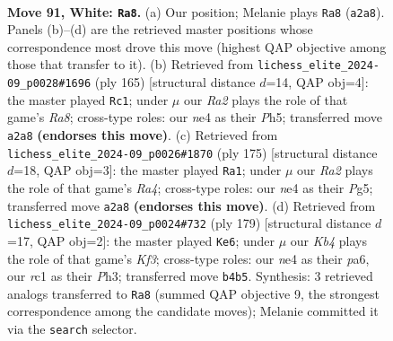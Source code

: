 \documentclass[11pt]{article}
\begin{document}
\clearpage

\begin{figure}[p]\centering
\begin{subfigure}{0.46\textwidth}\centering
\resizebox{\linewidth}{!}{%
\newchessgame
\chessboard[
  setfen={8/8/4k2p/4p3/1K1pn2b/8/R7/2r5 w - - 0 91},
  showmover=false,
  pgfstyle=straightmove, color=movearrow, markmove={a2-a8}
]}
\caption{}
\end{subfigure}\hfill
\begin{subfigure}{0.46\textwidth}\centering
\resizebox{\linewidth}{!}{%
\newchessgame
\chessboard[
  setfen={1R6/5k2/8/7p/7P/6P1/7K/r7 b - - 43 83},
  showmover=false,
  pgfstyle=straightmove, color=movearrow, markmove={a1-c1}
]}
\caption{}
\end{subfigure}
\\[4pt]
\begin{subfigure}{0.46\textwidth}\centering
\resizebox{\linewidth}{!}{%
\newchessgame
\chessboard[
  setfen={8/1R6/4k3/r5p1/6P1/5P2/6K1/8 b - - 83 88},
  showmover=false,
  pgfstyle=straightmove, color=movearrow, markmove={a5-a1}
]}
\caption{}
\end{subfigure}\hfill
\begin{subfigure}{0.46\textwidth}\centering
\resizebox{\linewidth}{!}{%
\newchessgame
\chessboard[
  setfen={8/7r/P4k2/8/2P5/1PK4p/8/3R4 b - - 0 90},
  showmover=false,
  pgfstyle=straightmove, color=movearrow, markmove={f6-e6}
]}
\caption{}
\end{subfigure}
\caption{\textbf{Move 91, White: \texttt{Ra8}.} (a) Our position; Melanie plays \texttt{Ra8} (\texttt{a2a8}). Panels (b)--(d) are the retrieved master positions whose correspondence most drove this move (highest QAP objective among those that transfer to it). (b) Retrieved from \texttt{lichess\_elite\_2024-09\_p0028\#1696} (ply 165) [structural distance $d$=14, QAP obj=4]: the master played \texttt{Rc1}; under $\mu$ our \emph{Ra2} plays the role of that game's \emph{Ra8}; cross-type roles: our \emph{n}e4 as their \emph{P}h5; transferred move \texttt{a2a8} \textbf{(endorses this move)}. (c) Retrieved from \texttt{lichess\_elite\_2024-09\_p0026\#1870} (ply 175) [structural distance $d$=18, QAP obj=3]: the master played \texttt{Ra1}; under $\mu$ our \emph{Ra2} plays the role of that game's \emph{Ra4}; cross-type roles: our \emph{n}e4 as their \emph{P}g5; transferred move \texttt{a2a8} \textbf{(endorses this move)}. (d) Retrieved from \texttt{lichess\_elite\_2024-09\_p0024\#732} (ply 179) [structural distance $d$=17, QAP obj=2]: the master played \texttt{Ke6}; under $\mu$ our \emph{Kb4} plays the role of that game's \emph{Kf3}; cross-type roles: our \emph{n}e4 as their \emph{p}a6, our \emph{r}c1 as their \emph{P}h3; transferred move \texttt{b4b5}. Synthesis: 3 retrieved analogs transferred to \texttt{Ra8} (summed QAP objective 9, the strongest correspondence among the candidate moves); Melanie committed it via the \texttt{search} selector.}
\label{fig:thought-m180}
\end{figure}
\end{document}
